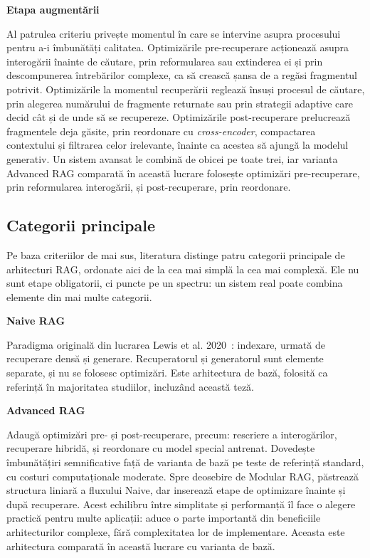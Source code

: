 \textbf{Etapa augmentării}

Al patrulea criteriu privește momentul în care se intervine asupra procesului pentru a-i îmbunătăți calitatea. Optimizările pre-recuperare acționează asupra interogării înainte de căutare, prin reformularea sau extinderea ei și prin descompunerea întrebărilor complexe, ca să crească șansa de a regăsi fragmentul potrivit. Optimizările la momentul recuperării reglează însuși procesul de căutare, prin alegerea numărului de fragmente returnate sau prin strategii adaptive care decid cât și de unde să se recupereze. Optimizările post-recuperare prelucrează fragmentele deja găsite, prin reordonare cu \textit{cross-encoder}, compactarea contextului și filtrarea celor irelevante, înainte ca acestea să ajungă la modelul generativ. Un sistem avansat le combină de obicei pe toate trei, iar varianta Advanced RAG comparată în această lucrare folosește optimizări pre-recuperare, prin reformularea interogării, și post-recuperare, prin reordonare.

\subsection{Categorii principale}

Pe baza criteriilor de mai sus, literatura distinge patru categorii principale de arhitecturi RAG, ordonate aici de la cea mai simplă la cea mai complexă. Ele nu sunt etape obligatorii, ci puncte pe un spectru: un sistem real poate combina elemente din mai multe categorii.

\textbf{Naive RAG}

Paradigma originală din lucrarea Lewis et al. 2020~\cite{lewis2020rag}: indexare, urmată de recuperare densă și generare. Recuperatorul și generatorul sunt elemente separate, și nu se folosesc optimizări. Este arhitectura de bază, folosită ca referință în majoritatea studiilor, incluzând această teză. 

\textbf{Advanced RAG}

Adaugă optimizări pre- și post-recuperare, precum: rescriere a interogărilor, recuperare hibridă, și reordonare cu model special antrenat. Dovedește îmbunătățiri semnificative față de varianta de bază pe teste de referință standard, cu costuri computaționale moderate. Spre deosebire de Modular RAG, păstrează structura liniară a fluxului Naive, dar inserează etape de optimizare înainte și după recuperare. Acest echilibru între simplitate și performanță îl face o alegere practică pentru multe aplicații: aduce o parte importantă din beneficiile arhitecturilor complexe, fără complexitatea lor de implementare. Aceasta este arhitectura comparată în această lucrare cu varianta de bază.

